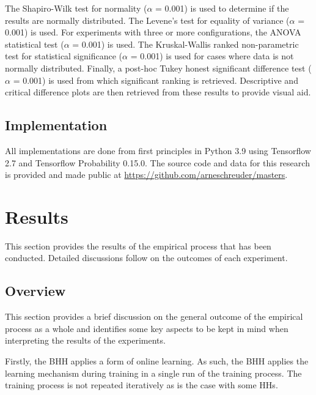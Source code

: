 \documentclass[preprint,review,12pt]{elsarticle}
\begin{document}
The Shapiro-Wilk test for normality \citep{ref:shapiro:1965} ($\alpha$ = 0.001) is used to determine if the results are normally distributed. The Levene's test for equality of variance \citep{ref:levene:1961} ($\alpha$ = 0.001) is used. For experiments with three or more configurations, the \acs{ANOVA} statistical test \citep{ref:fisher:1921} ($\alpha$ = 0.001) is used. The Kruskal-Wallis ranked non-parametric test \citep{ref:kruskal:1952} for statistical significance ($\alpha$ = 0.001) is used for cases where data is not normally distributed. Finally, a post-hoc Tukey honest significant difference test \citep{ref:tukey:1949} ($\alpha$ = 0.001) is used from which significant ranking is retrieved. Descriptive and critical difference plots are then retrieved from these results to provide visual aid.

\subsection{Implementation}\label{sec:methodology:implementation}

All implementations are done from first principles in Python 3.9 using Tensorflow 2.7 and Tensorflow Probability 0.15.0. The source code and data for this research is provided and made public at \url{https://github.com/arneschreuder/masters}.



\section{Results}
\label{sec:results}

This section provides the results of the empirical process that has been conducted. Detailed discussions follow on the outcomes of each experiment.

\subsection{Overview}\label{sec:results:overview}

This section provides a brief discussion on the general outcome of the empirical process as a whole and identifies some key aspects to be kept in mind when interpreting the results of the experiments.

Firstly, the \acs{BHH} applies a form of online learning. As such, the \acs{BHH} applies the learning mechanism during training in a single run of the training process. The training process is not repeated iteratively as is the case with some \acp{HH}.
\end{document}
